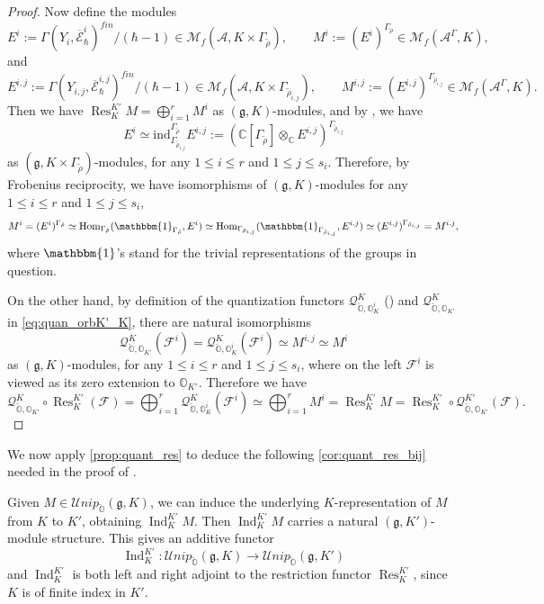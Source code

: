 \documentclass[11pt, a4paper]{amsart}
\newcommand{\C}{\mathbb{C}}
\newcommand{\A}{\mathcal{A}}
\newcommand{\g}{\mathfrak{g}}
\newcommand{\orb}{\mathbb{O}}
\newcommand{\orbk}{\orb_{K}}
\newcommand{\ckorb}{\check{\orb}}
\newcommand{\cF}{\mathcal{F}}
\newcommand{\cM}{\mathcal{M}}
\newcommand{\cE}{\mathcal{E}}
\newcommand{\hb}{\hbar}
\DeclareMathOperator{\Ind}{Ind}
\DeclareMathOperator{\res}{Res}
\newcommand{\cUnipOv}{\mathcal{U}nip_{\ckorb}}
\newcommand{\quan}{\mathcal{Q}}
\newcommand{\Hom}{\operatorname{Hom}}
\theoremstyle{definition}
\numberwithin{equation}{section}
\begin{document}
\begin{proof}
	Now define the modules 
		\[ E^i := \Gamma(Y_i, \overline{\cE}_\hb^i)^{fin} / (\hb-1) \in \cM_f(\A, K \times \Gamma_{\tilde{\rho}}), \qquad  M^i := (E^i)^{\Gamma_{\tilde{\rho}}} \in \cM_f(\A^{\Gamma}, K),\]
	and
		\[ E^{i,j} := \Gamma(Y_{i,j}, \overline{\cE}_\hb^{i,j})^{fin} / (\hb-1) \in \cM_f(\A, K \times \Gamma_{\tilde{\rho}_{i,j}}), \qquad  M^{i,j} := (E^{i,j})^{\Gamma_{\tilde{\rho}_{i,j}}} \in \cM_f(\A^{\Gamma}, K).\]
	Then we have $\res_{K}^{K'} M = \bigoplus_{i=1}^r M^i$ as $(\g,K)$-modules, and by , we have
	\[ 
		E^i \simeq \mathrm{ind}_{\Gamma_{\tilde{\rho}_{i,j}}}^{\Gamma_{\tilde{\rho}}} E^{i,j} := (\C[\Gamma_{\tilde{\rho}}] \otimes_\C E^{i,j})^{\Gamma_{\tilde{\rho}_{i,j}}}
	\]
	as $(\g,K \times \Gamma_{\tilde{\rho}})$-modules,
	for any $1 \leqslant i \leqslant r$ and $1 \leqslant j \leqslant s_i$. Therefore, by Frobenius reciprocity, we have isomorphisms of $(\g,K)$-modules for any $1 \leqslant i \leqslant r$ and $1 \leqslant j \leqslant s_i$,
		\[ M^i = (E^i)^{\Gamma_{\tilde{\rho}}} \simeq \Hom_{\Gamma_{\tilde{\rho}}}(\mathbbm{1}_{\Gamma_{\tilde{\rho}}}, E^i) \simeq \Hom_{\Gamma_{\tilde{\rho}_{i,j}}}(\mathbbm{1}_{\Gamma_{\tilde{\rho}_{i,j}}}, E^{i,j}) \simeq (E^{i,j})^{\Gamma_{\tilde{\rho}_{i,j}}} = M^{i,j}, \]
	where $\mathbbm{1}$'s stand for the trivial representations of the groups in question. 
	
	On the other hand, by definition of the quantization functors $\quan_{\ckorb, \orbk^i}^K$ () and $\quan_{\ckorb, \orb_{K'}}^K$ in \eqref{eq:quan_orbK'_K}, there are natural isomorphisms 
	\[ 
		\quan_{\ckorb, \orb_{K'}}^K(\cF^i) = \quan_{\ckorb, \orbk^i}^K (\cF^i) \simeq M^{i,j} \simeq M^i
	\] 
	as $(\g,K)$-modules, for any $1 \leqslant i \leqslant r$ and $1 \leqslant j \leqslant s_i$, where on the left $\cF^i$ is viewed as its zero extension to $\orb_{K'}$. Therefore we have
	\[ \quan_{\ckorb, \orb_{K'}}^K \circ \res_{K}^{K'} (\cF) = \bigoplus_{i=1}^r \quan_{\ckorb, \orbk^i}^K (\cF^i) \simeq \bigoplus_{i=1}^r M^i = \res_{K}^{K'} M = \res_{K}^{K'} \circ \quan_{\ckorb, \orb_{K'}}^{K'} (\cF). \]
\end{proof}

We now apply \cref{prop:quant_res} to deduce the following \cref{cor:quant_res_bij} needed in the proof of . 

Given $M \in \cUnipOv(\g, K)$, we can induce the underlying $K$-representation of $M$ from $K$ to $K'$, obtaining $\Ind_{K}^{K'} M$. Then $\Ind_{K}^{K'} M$ carries a natural $(\g, K')$-module structure. This gives an additive functor 
    \[ \Ind_{K}^{K'}: \cUnipOv(\g, K) \to \cUnipOv(\g, K') \] 
and $\Ind_{K}^{K'}$ is both left and right adjoint to the restriction functor $\res_{K}^{K'}$, since $K$ is of finite index in $K'$.
\end{document}
